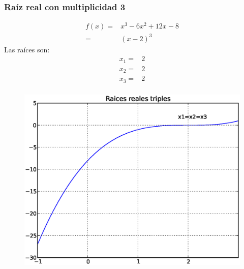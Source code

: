 \documentclass[12pt]{beamer}
\begin{document}
\begin{frame}[fragile]
\frametitle{Ra\'{i}z real con multiplicidad 3}
\begin{minipage}{5cm}
\fontsize{12}{12}\selectfont
\[ \begin{split}
f(x)=& x^{3} - 6x^{2} + 12x - 8 \\
=& (x-2)^{3}
\end{split} \]
Las ra\'{i}ces son:
\[ \begin{split}
x_{1} =& 2 \\
x_{2} =& 2 \\
x_{3} =& 2 \\
\end{split}\]
\end{minipage}
\hspace{0.5cm}
\begin{minipage}{4.5cm}
\begin{figure}
	\centering
	\includegraphics[scale=0.3]{raices02.eps} 
\end{figure}
\end{minipage}
\end{frame}
\end{document}
